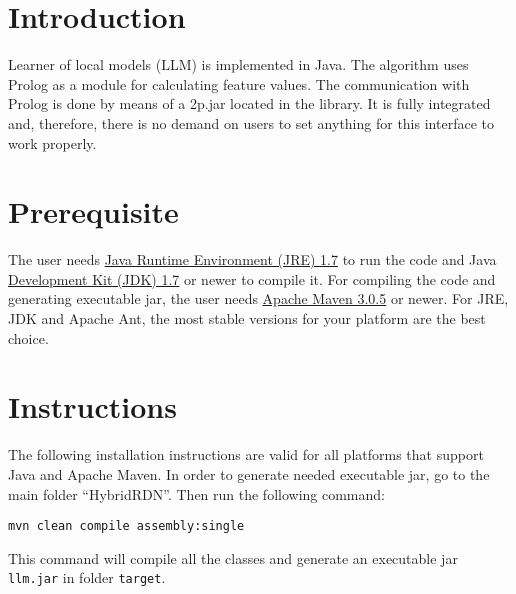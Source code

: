 \documentclass[12pt]{article}
\begin{document}
\maketitle


\section{Introduction}
Learner of local models (LLM) is implemented in Java. The algorithm uses Prolog as a module for 
calculating feature values. The communication with Prolog is done by means of a 2p.jar located in the library.
It is fully integrated and, therefore, there is no demand on users to set anything for this interface to work properly.

\section{Prerequisite}
The user needs \href{http://www.oracle.com/technetwork/java/javase/downloads/index.html}{Java Runtime Environment (JRE) 1.7} to run the code and Java \href{http://www.oracle.com/technetwork/java/javase/downloads/index.html}{Development Kit (JDK) 1.7} or newer to compile it. 
For compiling the code and generating executable jar, the user needs \href{https://maven.apache.org/}{Apache Maven 3.0.5} or newer. For JRE, JDK and Apache Ant,
the most stable versions for your platform are the best choice.


\section{Instructions}
The following installation instructions are valid for all platforms that support Java and Apache Maven.
In order to generate needed executable jar, go to the main folder ``HybridRDN''.
Then run the following command:
\begin{center}
 \texttt{mvn clean compile assembly:single}
\end{center}
This command will compile all the classes and generate an executable jar \texttt{llm.jar} in folder \texttt{target}.
\end{document}
